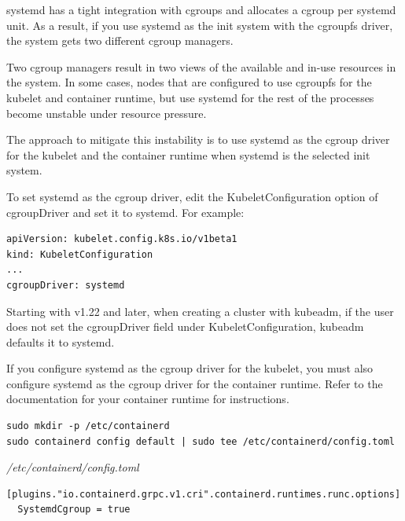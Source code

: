 \documentclass{article}
\newenvironment{blocktemplateII}[1]{%
    \tcolorbox[beamer,%
    noparskip,breakable,
    colframe=Green,%
    colbacklower=LimeGreen!75!LightGreen,%
    title=#1]}%
    {\endtcolorbox}
\newenvironment{codetemplate}[1][]{%
  \mybasecolorbox[#1]
  \itshape
}{%
  \endmybasecolorbox
}
\begin{document}
systemd has a tight integration with cgroups and allocates a cgroup per systemd unit. As a result, if you use systemd as the init system with the cgroupfs driver, the system gets two different cgroup managers.

Two cgroup managers result in two views of the available and in-use resources in the system. In some cases, nodes that are configured to use cgroupfs for the kubelet and container runtime, but use systemd for the rest of the processes become unstable under resource pressure.

The approach to mitigate this instability is to use systemd as the cgroup driver for the kubelet and the container runtime when systemd is the selected init system.

To set systemd as the cgroup driver, edit the KubeletConfiguration option of cgroupDriver and set it to systemd. For example:

\begin{codetemplate}{}
\begin{verbatim}
apiVersion: kubelet.config.k8s.io/v1beta1
kind: KubeletConfiguration
...
cgroupDriver: systemd
\end{verbatim}
\end{codetemplate}

\begin{blocktemplateII}{NOTE}
Starting with v1.22 and later, when creating a cluster with kubeadm, if the user does not set the cgroupDriver field under KubeletConfiguration, kubeadm defaults it to systemd.
\end{blocktemplateII}

If you configure systemd as the cgroup driver for the kubelet, you must also configure systemd as the cgroup driver for the container runtime. Refer to the documentation for your container runtime for instructions. 

\begin{codetemplate}{}
\begin{verbatim}
sudo mkdir -p /etc/containerd
sudo containerd config default | sudo tee /etc/containerd/config.toml
\end{verbatim}
\end{codetemplate}
\begin{codetemplate}{/etc/containerd/config.toml}
\begin{verbatim}
[plugins."io.containerd.grpc.v1.cri".containerd.runtimes.runc.options]
  SystemdCgroup = true
\end{verbatim}
\end{codetemplate}
\end{document}
